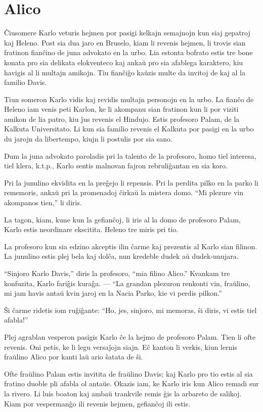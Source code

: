 \chapter{Alico}

Ĉiusomere Karlo veturis hejmen por pasigi kelkajn semajnojn kun siaj gepatroj kaj Heleno. Post sia dua jaro en Bruselo, kiam li revenis hejmen, li trovis sian fratinon fianĉino de juna advokato en la urbo. Lia estonta bofrato estis tre bone konata pro sia delikata elokventeco kaj ankaŭ pro sia afablega karaktero, kiu havigis al li multajn amikojn. Tiu fianĉiĝo kaŭzis multe da invitoj de kaj al la familio Davis.

Tiun someron Karlo vidis kaj revidis multajn personojn en la urbo. La fianĉo de Heleno iam venis peti Karlon, ke li akompanu sian fratinon kun li por viziti amikon de lia patro, kiu ĵus revenis el Hindujo. Estis profesoro Palam, de la Kalkuta Universitato. Li kun sia familio revenis el Kalkuta por pasigi en la urbo du jarojn da libertempo, kiujn li postulis por sia sano.

Dum la juna advokato paroladis pri la talento de la profesoro, homo tiel interesa, tiel klera, k.t.p., Karlo sentis malnovan fajron rebruliĝantan en sia koro.

Pri la junulino ekvidita en la preĝejo li repensis. Pri la perdita pilko en la parko li rememoris, ankaŭ pri la promenadoj ĉirkaŭ la mistera domo. ``Mi plezure vin akompanos tien,'' li diris.

La tagon, kiam, kune kun la gefianĉoj, li iris al la domo de profesoro Palam, Karlo estis neordinare ekscitita. Heleno tre miris pri tio.

La profesoro kun sia edzino akceptis ilin ĉarme kaj prezentis al Karlo sian filinon. La junulino estis plej bela kaj dolĉa, nun kredeble dudek aŭ dudek-unujara.

``Sinjoro Karlo Davis,'' diris la profesoro, ``mia filino Alico.'' Kvankam tre konfuzita, Karlo fariĝis kuraĝa. — ``La grandan plezuron renkonti vin, fraŭlino, mi jam havis antaŭ kvin jaroj en la Nacia Parko, kie vi perdis pilkon.''

Ŝi ĉarme ridetis iom ruĝiĝante: ``Ho, jes, sinjoro, mi memoras, ŝi diris, vi estis tiel afabla!''

Plej agrablan vesperon pasigis Karlo ĉe la hejmo de profesoro Palam. Tien li ofte revenis. Oni petis, ke li legu versaĵojn siajn. Eĉ kanton li verkis, kiun lernis fraŭlino Alico por kanti laŭ ario ŝatata de ŝi.

Ofte fraŭlino Palam estis invitita de fraŭlino Davis; kaj Karlo pro tio estis al sia fratino duoble pli afabla ol antaŭe. Okazis iam, ke Karlo iris kun Alico remadi sur la rivero. Li luis boaton kaj ambaŭ trankvile remis ĝis la arbareto de salikoj. Kiam por vespermanĝo ili revenis hejmen, gefianĉoj ili estis.

